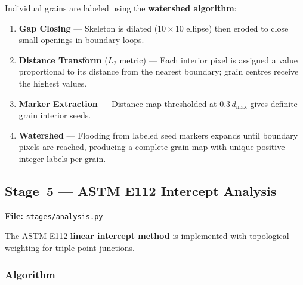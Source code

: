 \documentclass[12pt,a4paper]{article}
\newcommand{\file}[1]{\texttt{\small #1}}
\begin{document}
Individual grains are labeled using the \textbf{watershed algorithm}:

\begin{enumerate}[leftmargin=*]
    \item \textbf{Gap Closing} --- Skeleton is dilated ($10\times10$ ellipse)
          then eroded to close small openings in boundary loops.
    \item \textbf{Distance Transform} ($L_2$ metric) --- Each interior pixel
          is assigned a value proportional to its distance from the nearest
          boundary; grain centres receive the highest values.
    \item \textbf{Marker Extraction} --- Distance map thresholded at
          $0.3\,d_\mathrm{max}$ gives definite grain interior seeds.
    \item \textbf{Watershed} --- Flooding from labeled seed markers expands
          until boundary pixels are reached, producing a complete grain map
          with unique positive integer labels per grain.
\end{enumerate}

\subsection{Stage~5 --- ASTM E112 Intercept Analysis}

\textbf{File:} \file{stages/analysis.py}

The ASTM E112 \textbf{linear intercept method} is implemented with
topological weighting for triple-point junctions.

\subsubsection*{Algorithm}
\end{document}

